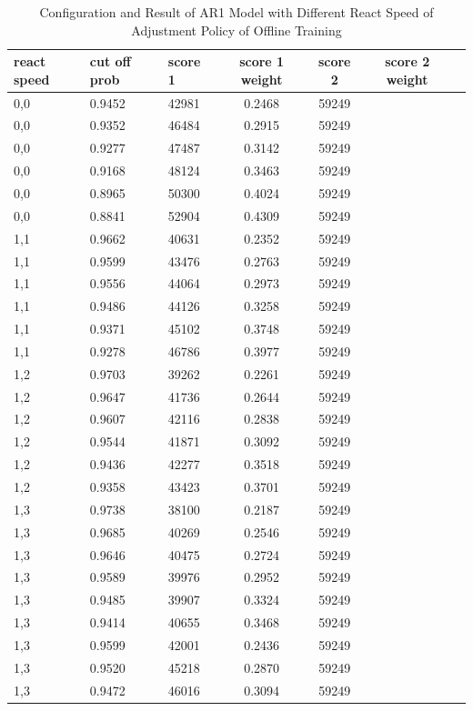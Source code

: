 \documentclass{article}
\begin{document}
\begin{longtable}[htbp]{l|l|l|*{4}{c}}
  \caption{Configuration and Result of AR1 Model with Different React Speed of Adjustment Policy of Offline Training}
  \label{tab:tab1.8.1} \\
  \textbf{react speed} & \textbf{cut off prob} & \textbf{score 1} &
  \textbf{score 1 weight} & \textbf{score 2} & \textbf{score 2 weight} \\
  \hline
  0,0 & 0.9452 & 42981 & 0.2468 & 59249\\
  0,0 & 0.9352 & 46484 & 0.2915 & 59249\\
  0,0 & 0.9277 & 47487 & 0.3142 & 59249\\
  0,0 & 0.9168 & 48124 & 0.3463 & 59249\\
  0,0 & 0.8965 & 50300 & 0.4024 & 59249\\
  0,0 & 0.8841 & 52904 & 0.4309 & 59249\\
  1,1 & 0.9662 & 40631 & 0.2352 & 59249\\
  1,1 & 0.9599 & 43476 & 0.2763 & 59249\\
  1,1 & 0.9556 & 44064 & 0.2973 & 59249\\
  1,1 & 0.9486 & 44126 & 0.3258 & 59249\\
  1,1 & 0.9371 & 45102 & 0.3748 & 59249\\
  1,1 & 0.9278 & 46786 & 0.3977 & 59249\\
  1,2 & 0.9703 & 39262 & 0.2261 & 59249\\
  1,2 & 0.9647 & 41736 & 0.2644 & 59249\\
  1,2 & 0.9607 & 42116 & 0.2838 & 59249\\
  1,2 & 0.9544 & 41871 & 0.3092 & 59249\\
  1,2 & 0.9436 & 42277 & 0.3518 & 59249\\
  1,2 & 0.9358 & 43423 & 0.3701 & 59249\\
  1,3 & 0.9738 & 38100 & 0.2187 & 59249\\
  1,3 & 0.9685 & 40269 & 0.2546 & 59249\\
  1,3 & 0.9646 & 40475 & 0.2724 & 59249\\
  1,3 & 0.9589 & 39976 & 0.2952 & 59249\\
  1,3 & 0.9485 & 39907 & 0.3324 & 59249\\
  1,3 & 0.9414 & 40655 & 0.3468 & 59249\\
  1,3 & 0.9599 & 42001 & 0.2436 & 59249\\
  1,3 & 0.9520 & 45218 & 0.2870 & 59249\\
  1,3 & 0.9472 & 46016 & 0.3094 & 59249\\

\end{longtable}
\end{document}
